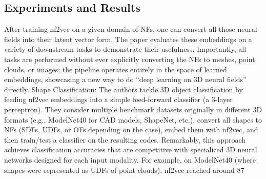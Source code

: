 \documentclass[11pt]{article}
\begin{document}
\subsection{Experiments and Results}
After training nf2vec on a given domain of NFs, one can convert all those neural fields into their latent vector form. The paper evaluates these embeddings on a variety of downstream tasks to demonstrate their usefulness. Importantly, all tasks are performed without ever explicitly converting the NFs to meshes, point clouds, or images; the pipeline operates entirely in the space of learned embeddings, showcasing a new way to do “deep learning on 3D neural fields” directly. Shape Classification: The authors tackle 3D object classification by feeding nf2vec embeddings into a simple feed-forward classifier (a 3-layer perceptron). They consider multiple benchmark datasets originally in different 3D formats (e.g., ModelNet40 for CAD models, ShapeNet, etc.), convert all shapes to NFs (SDFs, UDFs, or OFs depending on the case), embed them with nf2vec, and then train/test a classifier on the resulting codes. Remarkably, this approach achieves classification accuracies that are competitive with specialized 3D neural networks designed for each input modality. For example, on ModelNet40 (where shapes were represented as UDFs of point clouds), nf2vec reached around 87%
\end{document}
